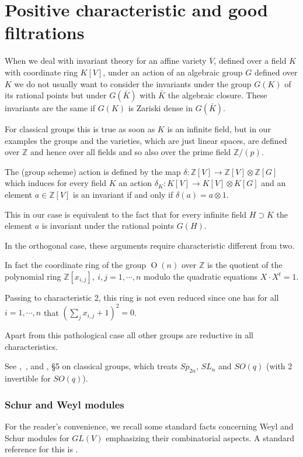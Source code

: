 \documentclass[10pt]{amsart}
\theoremstyle{definition}
\theoremstyle{remark}
\newcommand{\Z}{\mathbb Z}
\newcommand{\OO}{\operatorname{O}}
\begin{document}
\part{Positive characteristic and good filtrations}\label{pogf}
When we deal with invariant theory for an affine  variety $V$, defined over a  field $K$ with coordinate ring $K[V]$,    under an action of an algebraic group $G$ defined over  $K$ we do not usually want to consider the invariants under the group $G(K)$ of its rational points but under $G(\bar K)$ with $\bar K$ the algebraic closure. These invariants are the same if  $G(K)$ is Zariski dense in  $G(\bar K)$. \smallskip

For classical groups  this is true  as soon as $K$ is an infinite field, but in our examples the groups and the varieties, which are just linear spaces, are defined over $\Z$ and hence over all fields and 
so also  over the prime  field $\Z/(p)$. 

  The (group scheme) action is defined by the map $\delta: \Z[V]\to \Z[V]\otimes \Z[G]$  which induces for every field $K$ an action $\delta_K: K[V]\to K[V]\otimes K[G]$  and an element   $a\in \Z[V]$ is an invariant if and only if  $\delta(a)=a\otimes 1$.

This in our case is equivalent to the fact that for every infinite field  $H\supset K$  the element $a$ is invariant  under the rational points $G(H)$.\smallskip

In the orthogonal case, these arguments require characteristic different from two.

 In fact the coordinate ring of the  group $\OO(n)$ over $\Z$  is the quotient of the polynomial ring $\Z[x_{i,j}],\ i,j=1,\cdots,n$ modulo the quadratic equations  $X\cdot X^t=1$.   
 
 Passing to   characteristic 2, this ring is not even reduced  since one has for all $i=1,\cdots,n$  that $(\sum_jx_{i,j}+1)^2=0$.\medskip
 
 Apart from this pathological case all other groups are reductive in all characteristics.
 
 
See \cite{dem},\  \cite{Co},  and  \cite{Co1}, \S 5 on classical groups, which treats $Sp_{2n}$, $SL_n$ and $SO(q)$ (with 2 invertible for $SO(q)$).



\label{SchurWeyl}\section{Schur and Weyl modules}
For the reader's convenience,  we  recall some standard facts concerning Weyl and Schur modules for $GL(V)$   emphasizing their combinatorial aspects. A standard reference for this is  \cite{ABW}. 
\end{document}
